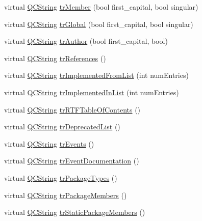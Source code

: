 \begin{DoxyCompactItemize}
\item 
virtual \hyperlink{class_q_c_string}{Q\-C\-String} \hyperlink{class_translator_indonesian_aaded5c915d8cd335abcd0e65e535cd71}{tr\-Member} (bool first\-\_\-capital, bool singular)
\item 
virtual \hyperlink{class_q_c_string}{Q\-C\-String} \hyperlink{class_translator_indonesian_ac9f8f800abe2f721d9cf0bdfc9b6ec6f}{tr\-Global} (bool first\-\_\-capital, bool singular)
\item 
virtual \hyperlink{class_q_c_string}{Q\-C\-String} \hyperlink{class_translator_indonesian_a0b7d86ba5eaed1bb4e7ea1036d6626c6}{tr\-Author} (bool first\-\_\-capital, bool)
\item 
virtual \hyperlink{class_q_c_string}{Q\-C\-String} \hyperlink{class_translator_indonesian_a54eaa9a933568bfd7eaffe36b7872eb0}{tr\-References} ()
\item 
virtual \hyperlink{class_q_c_string}{Q\-C\-String} \hyperlink{class_translator_indonesian_a01f548ba9f63fd42bc070ba1247e6543}{tr\-Implemented\-From\-List} (int num\-Entries)
\item 
virtual \hyperlink{class_q_c_string}{Q\-C\-String} \hyperlink{class_translator_indonesian_aa2aa7d2d195ce999a256e7769605c0f0}{tr\-Implemented\-In\-List} (int num\-Entries)
\item 
virtual \hyperlink{class_q_c_string}{Q\-C\-String} \hyperlink{class_translator_indonesian_aacd8ff5b2dcf79f4e8e72625d624a206}{tr\-R\-T\-F\-Table\-Of\-Contents} ()
\item 
virtual \hyperlink{class_q_c_string}{Q\-C\-String} \hyperlink{class_translator_indonesian_af7a7f1e3eaf6bc4c1026cfb73fbf486a}{tr\-Deprecated\-List} ()
\item 
virtual \hyperlink{class_q_c_string}{Q\-C\-String} \hyperlink{class_translator_indonesian_a43ec7331f50b74dc31b6d4e13879c93a}{tr\-Events} ()
\item 
virtual \hyperlink{class_q_c_string}{Q\-C\-String} \hyperlink{class_translator_indonesian_afb5c66237dd5bce42714ec9616a29887}{tr\-Event\-Documentation} ()
\item 
virtual \hyperlink{class_q_c_string}{Q\-C\-String} \hyperlink{class_translator_indonesian_a835fa6d7f51082a0d730d4759cbc5999}{tr\-Package\-Types} ()
\item 
virtual \hyperlink{class_q_c_string}{Q\-C\-String} \hyperlink{class_translator_indonesian_a595a1ba7b4f631a384b17e3c2084e271}{tr\-Package\-Members} ()
\item 
virtual \hyperlink{class_q_c_string}{Q\-C\-String} \hyperlink{class_translator_indonesian_a8f144cf1daf28327dec2fe32c7fcb020}{tr\-Static\-Package\-Members} ()

\end{DoxyCompactItemize}
